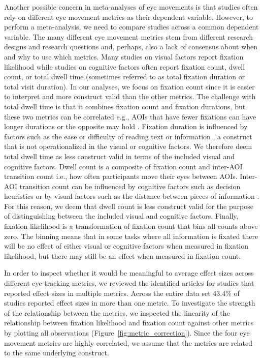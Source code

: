 Another possible concern in meta-analyses of eye movements is that studies often rely on different eye movement metrics as their dependent variable. However, to perform a meta-analysis, we need to compare studies across a common dependent variable. The many different eye movement metrics stem from different research designs and research questions and, perhaps, also a lack of consensus about when and why to use which metrics. Many studies on visual factors report fixation likelihood while studies on cognitive factors often report fixation count, dwell count, or total dwell time (sometimes referred to as total fixation duration or total visit duration). In our analyses, we focus on fixation count since it is easier to interpret and more construct valid than the other metrics. The challenge with total dwell time is that it combines fixation count and fixation durations, but these two metrics can be correlated e.g., AOIs that have fewer fixations can have longer durations or the opposite may hold \citep{orquin2018a}. Fixation duration is influenced by factors such as the ease or difficulty of reading text or information \citep{rayner2009}, a construct that is not operationalized in the visual or cognitive factors. We therefore deem total dwell time as less construct valid in terms of the included visual and cognitive factors. Dwell count is a composite of fixation count and inter-AOI transition count i.e., how often participants move their eyes between AOIs. Inter-AOI transition count can be influenced by cognitive factors such as decision heuristics \citep{schoemann2019} or by visual factors such as the distance between pieces of information \citep{perkovic2018}. For this reason, we deem that dwell count is less construct valid for the purpose of distinguishing between the included visual and cognitive factors. Finally, fixation likelihood is a transformation of fixation count that bins all counts above zero. The binning means that in some tasks where all information is fixated there will be no effect of either visual or cognitive factors when measured in fixation likelihood, but there may still be an effect when measured in fixation count.

In order to inspect whether it would be meaningful to average effect sizes across different eye-tracking metrics, we reviewed the identified articles for studies that reported effect sizes in multiple metrics. Across the entire data set $43.4$\% of studies reported effect sizes in more than one metric. To investigate the strength of the relationship between the metrics, we inspected the linearity of the relationship between fixation likelihood and fixation count against other metrics by plotting all observations (Figure~\ref{fig:metric_correction}). Since the four eye movement metrics are highly correlated, we assume that the metrics are related to the same underlying construct. 

